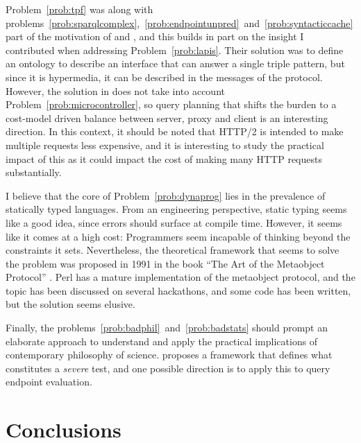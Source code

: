 Problem~\ref{prob:tpf} was along with
problems~\ref{prob:sparqlcomplex},~\ref{prob:endpointunpred}~and~\ref{prob:syntacticcache}
part of the motivation of \cite{ldf1} and \cite{verborgh2014querying},
and this builds in part on the insight I contributed when addressing
Problem~\ref{prob:lapis}. Their solution was to define an ontology to
describe an interface that can answer a single triple pattern, but
since it is hypermedia, it can be described in the messages of the
protocol. However, the solution in \cite{verborgh2014querying} does
not take into account Problem~\ref{prob:microcontroller}, so query
planning that shifts the burden to a cost-model driven balance between
server, proxy and client is an interesting direction. In this context,
it should be noted that HTTP/2 \cite{rfc7540} is intended to make
multiple requests less expensive, and it is interesting to study the
practical impact of this as it could impact the cost of making many
HTTP requests substantially.

I believe that the core of Problem~\ref{prob:dynaprog} lies in the
prevalence of statically typed languages. From an engineering
perspective, static typing seems like a good idea, since errors should
surface at compile time. However, it seems like it comes at a high
cost: Programmers seem incapable of thinking beyond the constraints it
sets. Nevertheless, the theoretical framework that seems to solve the
problem was proposed in 1991 in the book ``The Art of the Metaobject
Protocol'' \cite{kiczales1991art}. Perl has a mature implementation of
the metaobject protocol, and the topic has been discussed on several
hackathons, and some code has been written, but the solution seems
elusive.

Finally, the problems~\ref{prob:badphil}~and~\ref{prob:badstats}
should prompt an elaborate approach to understand and apply the
practical implications of contemporary philosophy of
science. \cite{Mayo2005-MAYEAP} proposes a framework that defines what
constitutes a \emph{severe} test, and one possible direction is to
apply this to query endpoint evaluation.

\section{Conclusions}\label{sec:conclusions}

